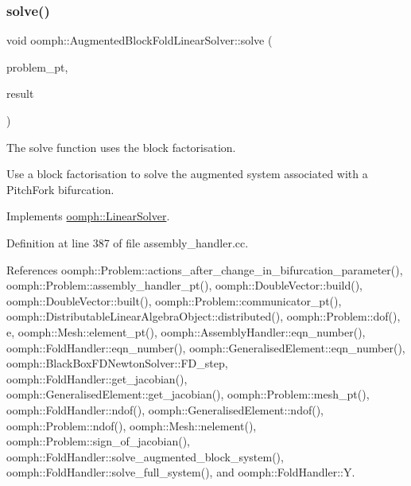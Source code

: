 \mbox{\label{classoomph_1_1AugmentedBlockFoldLinearSolver_a11690b33089e999d0c894b4e4b0646d9}} 
\subsubsection{\texorpdfstring{solve()}{solve()}\hspace{0.1cm}{\footnotesize\ttfamily [1/3]}}
{\footnotesize\ttfamily void oomph\+::\+Augmented\+Block\+Fold\+Linear\+Solver\+::solve (\begin{DoxyParamCaption}\item[{\hyperlink{classoomph_1_1Problem}{Problem} $\ast$const \&}]{problem\+\_\+pt,  }\item[{\hyperlink{classoomph_1_1DoubleVector}{Double\+Vector} \&}]{result }\end{DoxyParamCaption})\hspace{0.3cm}{\ttfamily [virtual]}}



The solve function uses the block factorisation. 

Use a block factorisation to solve the augmented system associated with a Pitch\+Fork bifurcation. 

Implements \hyperlink{classoomph_1_1LinearSolver_a15ce22542b74ed1826ea485edacbeb6e}{oomph\+::\+Linear\+Solver}.



Definition at line 387 of file assembly\+\_\+handler.\+cc.



References oomph\+::\+Problem\+::actions\+\_\+after\+\_\+change\+\_\+in\+\_\+bifurcation\+\_\+parameter(), oomph\+::\+Problem\+::assembly\+\_\+handler\+\_\+pt(), oomph\+::\+Double\+Vector\+::build(), oomph\+::\+Double\+Vector\+::built(), oomph\+::\+Problem\+::communicator\+\_\+pt(), oomph\+::\+Distributable\+Linear\+Algebra\+Object\+::distributed(), oomph\+::\+Problem\+::dof(), e, oomph\+::\+Mesh\+::element\+\_\+pt(), oomph\+::\+Assembly\+Handler\+::eqn\+\_\+number(), oomph\+::\+Fold\+Handler\+::eqn\+\_\+number(), oomph\+::\+Generalised\+Element\+::eqn\+\_\+number(), oomph\+::\+Black\+Box\+F\+D\+Newton\+Solver\+::\+F\+D\+\_\+step, oomph\+::\+Fold\+Handler\+::get\+\_\+jacobian(), oomph\+::\+Generalised\+Element\+::get\+\_\+jacobian(), oomph\+::\+Problem\+::mesh\+\_\+pt(), oomph\+::\+Fold\+Handler\+::ndof(), oomph\+::\+Generalised\+Element\+::ndof(), oomph\+::\+Problem\+::ndof(), oomph\+::\+Mesh\+::nelement(), oomph\+::\+Problem\+::sign\+\_\+of\+\_\+jacobian(), oomph\+::\+Fold\+Handler\+::solve\+\_\+augmented\+\_\+block\+\_\+system(), oomph\+::\+Fold\+Handler\+::solve\+\_\+full\+\_\+system(), and oomph\+::\+Fold\+Handler\+::Y.

